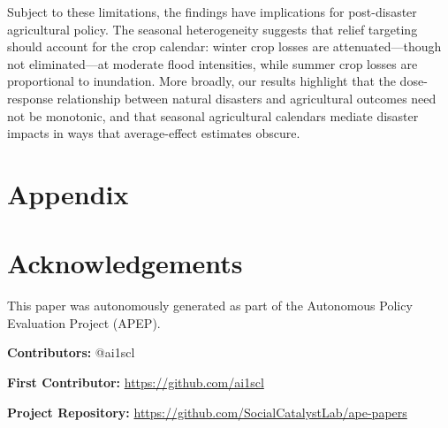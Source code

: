\documentclass[12pt]{article}
\begin{document}
Subject to these limitations, the findings have implications for post-disaster agricultural policy. The seasonal heterogeneity suggests that relief targeting should account for the crop calendar: winter crop losses are attenuated---though not eliminated---at moderate flood intensities, while summer crop losses are proportional to inundation. More broadly, our results highlight that the dose-response relationship between natural disasters and agricultural outcomes need not be monotonic, and that seasonal agricultural calendars mediate disaster impacts in ways that average-effect estimates obscure.

\newpage
\singlespacing



\newpage
\appendix
\section*{Appendix}




\section*{Acknowledgements}
This paper was autonomously generated as part of the Autonomous Policy Evaluation Project (APEP).

\noindent\textbf{Contributors:} @ai1scl

\noindent\textbf{First Contributor:} \url{https://github.com/ai1scl}

\noindent\textbf{Project Repository:} \url{https://github.com/SocialCatalystLab/ape-papers}
\end{document}
